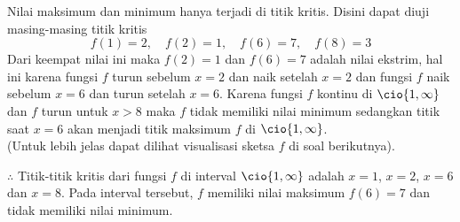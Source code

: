 \begin{enumerate}[leftmargin=*, label={\arabic*}.]
\begin{enumerate}[label={\alph*}.]
    Nilai maksimum dan minimum hanya terjadi di titik kritis. Disini dapat diuji masing-masing 
    titik kritis
    \[
        f(1) = 2, \quad f(2)=1, \quad f(6) =7, \quad f(8) = 3
    \]
    Dari keempat nilai ini maka $f(2)=1$ dan $f(6)=7$ adalah nilai ekstrim, hal ini karena fungsi $f$ 
    turun sebelum $x=2$ dan naik setelah $x=2$ dan fungsi $f$ naik sebelum $x=6$ dan turun setelah 
    $x=6$. Karena fungsi $f$ kontinu di $\cio{1,\infty}$ dan $f$ turun untuk $x>8$ maka 
    $f$ tidak memiliki nilai minimum sedangkan titik saat $x=6$ akan menjadi titik maksimum $f$ di 
    $\cio{1,\infty}$. \\
    (Untuk lebih jelas dapat dilihat visualisasi sketsa $f$ di soal 
    berikutnya).

    $\therefore$ Titik-titik kritis dari fungsi $f$ di interval $\cio{1,\infty}$ adalah 
    $x=1$, $x=2$, $x=6$ dan $x=8$. Pada interval tersebut, $f$ memiliki nilai maksimum $f(6)=7$ 
    dan tidak memiliki nilai minimum.


\end{enumerate}
\end{enumerate}
